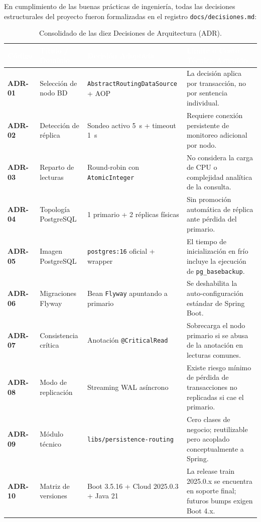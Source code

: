 \documentclass[12pt,a4paper]{article}
\begin{document}
En cumplimiento de las buenas pr\'{a}cticas de ingenier\'{i}a, todas las decisiones estructurales del proyecto fueron formalizadas en el registro \texttt{docs/decisiones.md}:

\begin{table}[H]
\centering
\small
\begin{tabularx}{\textwidth}{@{}L{1.8cm}L{3.2cm}L{3.8cm}Y@{}}
\toprule[1.2pt]
\textcolor{white}{\textbf{C\'{o}digo}} & 
\textcolor{white}{\textbf{T\'{i}tulo / Dominio}} & 
\textcolor{white}{\textbf{Decisi\'{o}n Adoptada}} & 
\textcolor{white}{\textbf{L\'{i}mite o Costo T\'{e}cnico Asumido}} \\
\midrule[0.8pt]
\textbf{ADR-01} & Selecci\'{o}n de nodo BD & \texttt{AbstractRoutingDataSource} + AOP & La decisi\'{o}n aplica por transacci\'{o}n, no por sentencia individual. \\
\textbf{ADR-02} & Detecci\'{o}n de r\'{e}plica & Sondeo activo 5~s + timeout 1~s & Requiere conexi\'{o}n persistente de monitoreo adicional por nodo. \\
\textbf{ADR-03} & Reparto de lecturas & Round-robin con \texttt{AtomicInteger} & No considera la carga de CPU o complejidad anal\'{i}tica de la consulta. \\
\textbf{ADR-04} & Topolog\'{i}a PostgreSQL & 1 primario + 2 r\'{e}plicas f\'{i}sicas & Sin promoci\'{o}n autom\'{a}tica de r\'{e}plica ante p\'{e}rdida del primario. \\
\textbf{ADR-05} & Imagen PostgreSQL & \texttt{postgres:16} oficial + wrapper & El tiempo de inicializaci\'{o}n en fr\'{i}o incluye la ejecuci\'{o}n de \texttt{pg\_basebackup}. \\
\textbf{ADR-06} & Migraciones Flyway & Bean \texttt{Flyway} apuntando a primario & Se deshabilita la auto-configuraci\'{o}n est\'{a}ndar de Spring Boot. \\
\textbf{ADR-07} & Consistencia cr\'{i}tica & Anotaci\'{o}n \texttt{@CriticalRead} & Sobrecarga el nodo primario si se abusa de la anotaci\'{o}n en lecturas comunes. \\
\textbf{ADR-08} & Modo de replicaci\'{o}n & Streaming WAL as\'{i}ncrono & Existe riesgo m\'{i}nimo de p\'{e}rdida de transacciones no replicadas si cae el primario. \\
\textbf{ADR-09} & M\'{o}dulo t\'{e}cnico & \texttt{libs/persistence-routing} & Cero clases de negocio; reutilizable pero acoplado conceptualmente a Spring. \\
\textbf{ADR-10} & Matriz de versiones & Boot 3.5.16 + Cloud 2025.0.3 + Java 21 & La release train 2025.0.x se encuentra en soporte final; futuros bumps exigen Boot 4.x. \\
\bottomrule[1.2pt]
\end{tabularx}
\caption{Consolidado de las diez Decisiones de Arquitectura (ADR).}
\label{tab:adrs}
\end{table}
\end{document}
